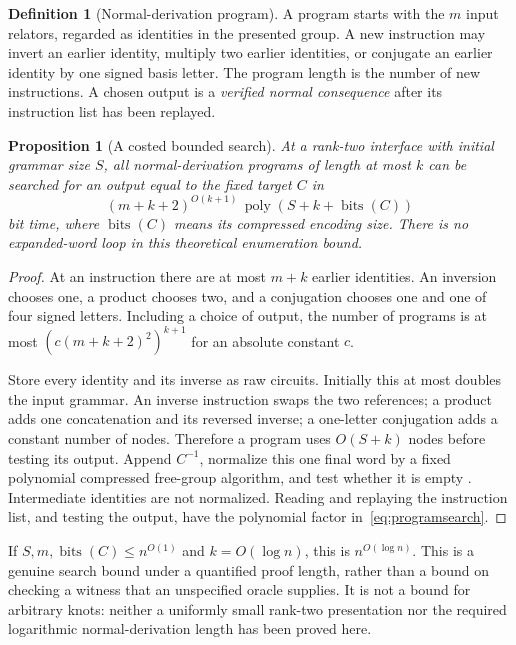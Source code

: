 \documentclass[11pt,letterpaper]{article}
\newtheorem{proposition}[theorem]{Proposition}
\theoremstyle{definition}
\newtheorem{definition}[theorem]{Definition}
\newcommand{\bits}{\operatorname{bits}}
\newcommand{\poly}{\operatorname{poly}}
\begin{document}
\begin{definition}[Normal-derivation program]
A program starts with the $m$ input relators, regarded as identities in the
presented group. A new instruction may invert an earlier identity, multiply
two earlier identities, or conjugate an earlier identity by one signed
basis letter. The program length is the number of new instructions. A
chosen output is a \emph{verified normal consequence} after its instruction
list has been replayed.
\end{definition}

\begin{proposition}[A costed bounded search]
\label{prop:programsearch}
At a rank-two interface with initial grammar size $S$, all normal-derivation
programs of length at most $k$ can be searched for an output equal to the
fixed target $C$ in
\begin{equation}
 (m+k+2)^{O(k+1)}\,\poly(S+k+\bits(C))
 \label{eq:programsearch}
\end{equation}
bit time, where $\bits(C)$ means its compressed encoding size. There is no
expanded-word loop in this theoretical enumeration bound.
\end{proposition}
\begin{proof}
At an instruction there are at most $m+k$ earlier identities. An inversion
chooses one, a product chooses two, and a conjugation chooses one and one
of four signed letters. Including a choice of output, the number of
programs is at most $(c(m+k+2)^2)^{k+1}$ for an absolute constant $c$.

Store every identity and its inverse as raw circuits. Initially this at
most doubles the input grammar. An inverse instruction swaps the two
references; a product adds one concatenation and its reversed inverse;
a one-letter conjugation adds a constant number of nodes. Therefore a
program uses $O(S+k)$ nodes before testing its output. Append $C^{-1}$,
normalize this one final word by a fixed polynomial compressed free-group
algorithm, and test whether it is empty \cite{Schleimer}. Intermediate
identities are not normalized. Reading and replaying the instruction list,
and testing the output, have the polynomial factor in~\eqref{eq:programsearch}.
\end{proof}

If $S,m,\bits(C)\leq n^{O(1)}$ and $k=O(\log n)$, this is
$n^{O(\log n)}$. This is a genuine search bound under a quantified proof
length, rather than a bound on checking a witness that an unspecified oracle
supplies. It is not a bound for arbitrary knots: neither a uniformly small
rank-two presentation nor the required logarithmic normal-derivation length
has been proved here.
\end{document}

